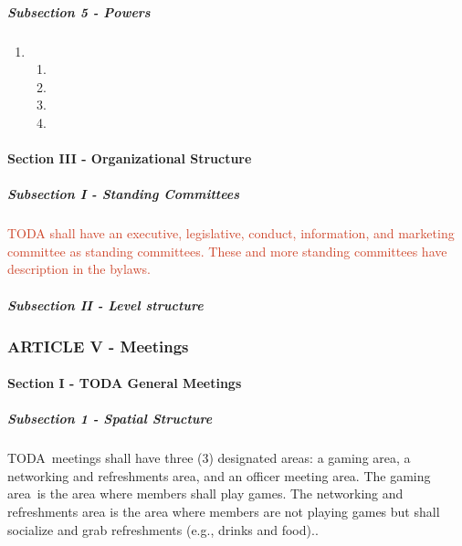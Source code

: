 \documentclass[12pt]{report}
\begin{document}
\subparagraph{Subsection 5 - Powers}
\begin{enumerate}[label*=\arabic*.]
	\item \begin{enumerate}[label*=\arabic*.]
	\item \par

	\item \par

	\item \par

	\item \par


\vspace{\baselineskip}

\vspace{\baselineskip}

\end{enumerate}
\end{enumerate}\paragraph*{Section III - Organizational Structure}
\subparagraph{Subsection I - Standing Committees}
\textcolor[HTML]{CC4125}{\tab TODA shall have an executive, legislative, conduct, information, and marketing committee as standing committees. These and more standing committees have description in the bylaws.}\par

\subparagraph{Subsection II - Level structure}

\vspace{\baselineskip}
\subsubsection*{ARTICLE V - Meetings}
\paragraph*{Section I - TODA General Meetings}
\subparagraph{Subsection 1 - Spatial Structure}
\tab TODA\ meetings shall have three (3) designated areas: a gaming area, a networking and refreshments area, and an officer meeting area.  The gaming area\ is the area where members shall play games.  The networking and refreshments area is the area where members are not playing games but shall socialize and grab refreshments (e.g., drinks and food)..\par
\end{document}
